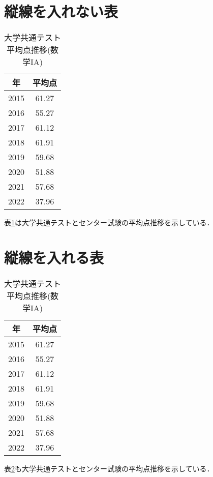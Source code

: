 \documentclass[a4j]{jarticle}
\begin{document}
\section{縦線を入れない表}
\begin{table}[htbp]
    \caption{大学共通テスト平均点推移(数学IA)}
    \centering
    \begin{tabular}{cc}
        \hline \hline
        年 & 平均点 \\ \hline
        2015  & 61.27 \\
        2016  & 55.27 \\
        2017  & 61.12 \\
        2018  & 61.91 \\
        2019  & 59.68 \\ 
        2020  & 51.88 \\
        2021  & 57.68 \\
        2022  & 37.96 \\ \hline
    \end{tabular}
    \label{test1}
\end{table}
表\ref{test1}は大学共通テストとセンター試験の平均点推移を示している．

\section{縦線を入れる表}
\begin{table}[htbp]
    \caption{大学共通テスト平均点推移(数学IA)}
    \centering
    \begin{tabular}{|c|c|}
        \hline
        年 & 平均点 \\ \hline
        2015  & 61.27 \\
        2016  & 55.27 \\
        2017  & 61.12 \\
        2018  & 61.91 \\
        2019  & 59.68 \\ 
        2020  & 51.88 \\
        2021  & 57.68 \\
        2022  & 37.96 \\ \hline
    \end{tabular}
    \label{test2}
\end{table}
表\ref{test2}も大学共通テストとセンター試験の平均点推移を示している．
\end{document}

